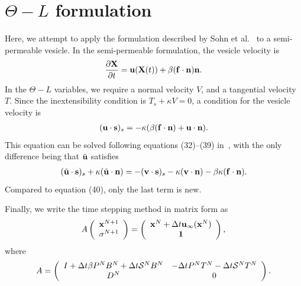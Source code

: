 \documentclass[aps,prl,showpacs]{revtex4}
\begin{document}
\section{{$\Theta-L$} formulation}
Here, we attempt to apply the formulation described by Sohn et
al.~\cite{soh-tse-li-voi-low2010} to a semi-permeable vesicle.  In the
semi-permeable formulation, the vesicle velocity is
\begin{align}
  \frac{\partial \mathbf{X}}{\partial t} = \mathbf{u}(\mathbf{X}(t)) + \beta (\mathbf{f} \cdot \mathbf{n}) \mathbf{n}.
\end{align}
In the {$\Theta-L$} variables, we require a normal velocity $V$, and a
tangential velocity $T$. Since the inextensibility condition is $T_s +
\kappa V = 0$, a condition for the vesicle velocity is
\begin{align}
  (\mathbf{u} \cdot \mathbf{s})_s = -\kappa(\beta (\mathbf{f} \cdot \mathbf{n}) + 
      \mathbf{u} \cdot \mathbf{n}).
\end{align}
This equation can be solved following equations (32)--(39)
in~\cite{soh-tse-li-voi-low2010}, with the only difference being that
$\tilde{\mathbf{u}}$ satisfies
\begin{align}
  (\tilde{\mathbf{u}} \cdot \mathbf{s})_s + \kappa(\tilde{\mathbf{u}} \cdot \mathbf{n}) =
    -(\mathbf{v} \cdot \mathbf{s})_s - \kappa(\mathbf{v} \cdot \mathbf{n}) 
    - \beta\kappa(\mathbf{f} \cdot \mathbf{n}).
\end{align}
Compared to equation (40), only the last term is new.


Finally, we write the time stepping method in matrix form as
\begin{align}
  A \left(
    \begin{array}{c}
      \mathbf{x}^{N+1} \\ \sigma^{N+1}
    \end{array}
  \right) = 
  \left(
    \begin{array}{c}
      \mathbf{x}^{N} + \Delta t \mathbf{u}_\infty(\mathbf{x}^N) \\ \mathbf{1}
    \end{array}
  \right),
\end{align}
where
\begin{align}
 A = \left(
  \begin{array}{cc}
    I + \Delta t \beta P^N B^N + \Delta t \mathcal{S}^N B^N & 
    -\Delta t P^N T^N - \Delta t \mathcal{S}^N T^N \\
    D^N & 0
  \end{array}
  \right).
\end{align}
\end{document}

